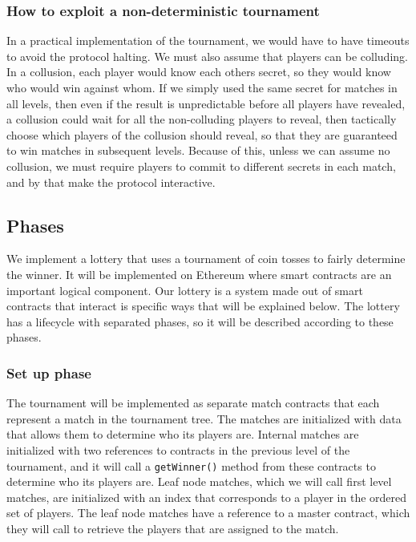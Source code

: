 \subsubsection{How to exploit a non-deterministic tournament}  %
In a practical implementation of the tournament, we would have to have timeouts to avoid the protocol halting. We must also assume that players can be colluding. In a collusion, each player would know each others secret, so they would know who would win against whom. If we simply used the same secret for matches in all levels, then even if the result is unpredictable before all players have revealed, a collusion could wait for all the non-colluding players to reveal, then tactically choose which players of the collusion should reveal, so that they are guaranteed to win matches in subsequent levels. Because of this, unless we can assume no collusion, we must require players to commit to different secrets in each match, and by that make the protocol interactive.

\subsection{Phases}

We implement a lottery that uses a tournament of coin tosses to fairly determine the winner. It will be implemented on Ethereum where smart contracts are an important logical component. Our lottery is a system made out of smart contracts that interact is specific ways that will be explained below. The lottery has a lifecycle with separated phases, so it will be described according to these phases.

\subsubsection{Set up phase}
The tournament will be implemented as separate match contracts that each represent a match in the tournament tree. The matches are initialized with data that allows them to determine who its players are. Internal matches are initialized with two references to contracts in the previous level of the tournament, and it will call a \texttt{getWinner()} method from these contracts to determine who its players are. Leaf node matches, which we will call first level matches, are initialized with an index that corresponds to a player in the ordered set of players. The leaf node matches have a reference to a master contract, which they will call to retrieve the players that are assigned to the match.

